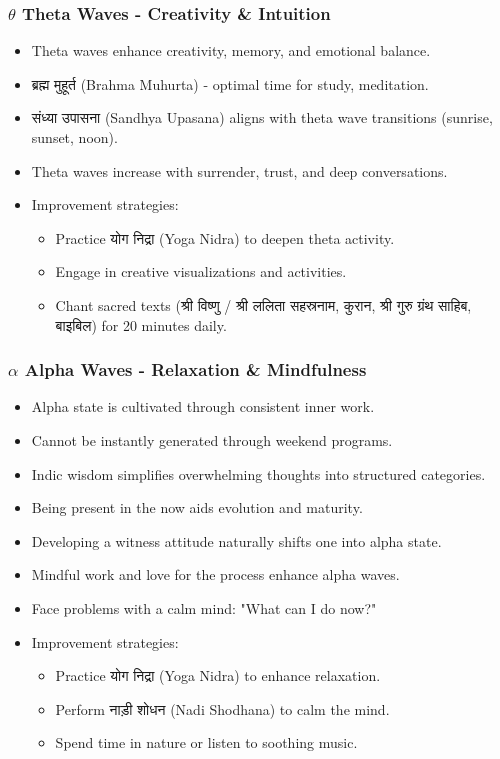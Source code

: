 \begin{frame}[fragile]\frametitle{$\theta$ Theta Waves - Creativity \& Intuition}
      \begin{itemize}
          \item Theta waves enhance creativity, memory, and emotional balance.
          \item ब्रह्म मुहूर्त (Brahma Muhurta) - optimal time for study, meditation.
          \item संध्या उपासना (Sandhya Upasana) aligns with theta wave transitions (sunrise, sunset, noon).
          \item Theta waves increase with surrender, trust, and deep conversations.
          \item Improvement strategies:
            \begin{itemize}
                \item Practice योग निद्रा (Yoga Nidra) to deepen theta activity.
                \item Engage in creative visualizations and activities.
                \item Chant sacred texts (श्री विष्णु / श्री ललिता सहस्रनाम, कुरान, श्री गुरु ग्रंथ साहिब, बाइबिल) for 20 minutes daily.
            \end{itemize}
      \end{itemize}
\end{frame}

\begin{frame}[fragile]\frametitle{$\alpha$ Alpha Waves - Relaxation \& Mindfulness}
      \begin{itemize}
          \item Alpha state is cultivated through consistent inner work.
          \item Cannot be instantly generated through weekend programs.
          \item Indic wisdom simplifies overwhelming thoughts into structured categories.
          \item Being present in the now aids evolution and maturity.
          \item Developing a witness attitude naturally shifts one into alpha state.
          \item Mindful work and love for the process enhance alpha waves.
          \item Face problems with a calm mind: "What can I do now?"
          \item Improvement strategies:
            \begin{itemize}
                \item Practice योग निद्रा (Yoga Nidra) to enhance relaxation.
                \item Perform नाड़ी शोधन (Nadi Shodhana) to calm the mind.
                \item Spend time in nature or listen to soothing music.
            \end{itemize}
      \end{itemize}
\end{frame}

